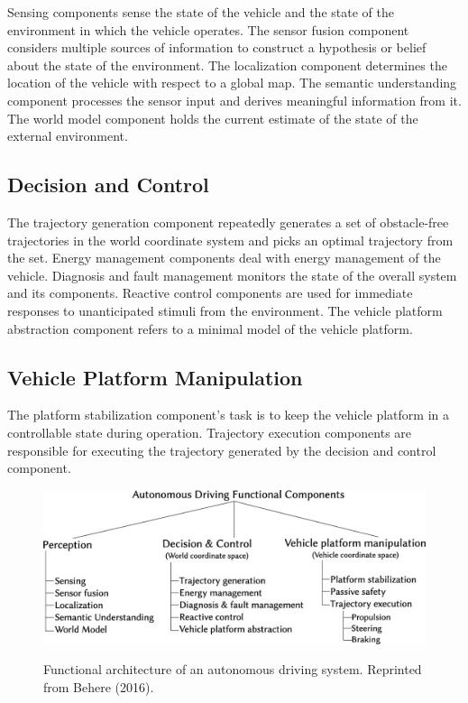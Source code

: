 Sensing components sense the state of the vehicle and the state of the environment in which the vehicle operates. The sensor fusion component considers multiple sources of information to construct a hypothesis or belief about the state of the environment. The localization component determines the location of the vehicle with respect to a global map. The semantic understanding component processes the sensor input and derives meaningful information from it. The world model component holds the current estimate of the state of the external environment.

\subsection{Decision and Control}
The trajectory generation component repeatedly generates a set of obstacle-free trajectories in the world coordinate system and picks an optimal trajectory from the set. Energy management components deal with energy management of the vehicle. Diagnosis and fault management monitors the state of the overall system and its components. Reactive control components are used for immediate responses to unanticipated stimuli from the environment. The vehicle platform abstraction component refers to a minimal model of the vehicle platform. 

\subsection{Vehicle Platform Manipulation}

The platform stabilization component's task is to keep the vehicle platform in a controllable state during operation. Trajectory execution components are responsible for executing the trajectory generated by the decision and control component. 

\begin{figure}
	\centering
	\caption[FAV of Antonomous Driving System.]{\small 
		Functional architecture of an autonomous driving system. Reprinted from Behere (2016). }
	\includegraphics[width=5in]{figures/literature/fav_autonomous_driving}
    \label{fig:fav_automonous}
\end{figure}

